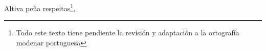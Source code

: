 Altiva peña respeitas\footnote{\textsuperscript{} Todo este texto tiene pendiente la revisión y adaptación a la ortografía modenar portuguesa},
